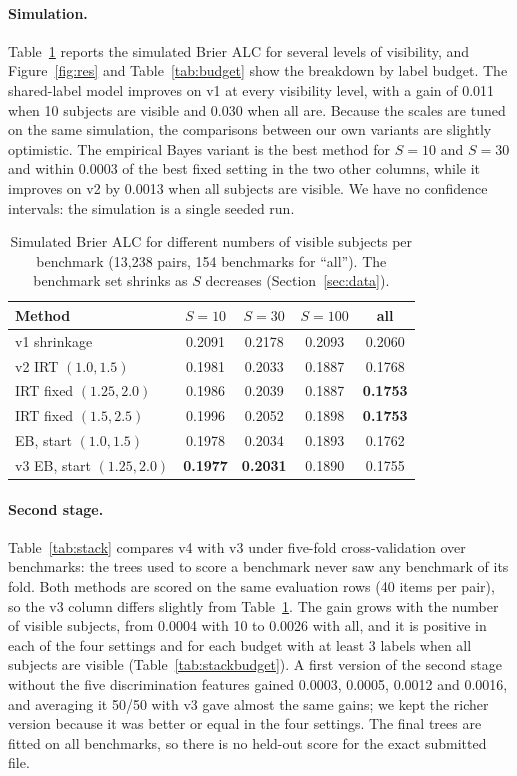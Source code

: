 \documentclass{article}
\begin{document}
\paragraph{Simulation.} Table~\ref{tab:sim} reports the simulated Brier ALC for several levels of visibility, and Figure~\ref{fig:res} and Table~\ref{tab:budget} show the breakdown by label budget. The shared-label model improves on v1 at every visibility level, with a gain of 0.011 when 10 subjects are visible and 0.030 when all are. Because the scales are tuned on the same simulation, the comparisons between our own variants are slightly optimistic. The empirical Bayes variant is the best method for $S{=}10$ and $S{=}30$ and within 0.0003 of the best fixed setting in the two other columns, while it improves on v2 by 0.0013 when all subjects are visible. We have no confidence intervals: the simulation is a single seeded run.

\begin{table}[h]
\centering
\caption{Simulated Brier ALC for different numbers of visible subjects per benchmark (13{,}238 pairs, 154 benchmarks for ``all''). The benchmark set shrinks as $S$ decreases (Section~\ref{sec:data}).}
\label{tab:sim}
\begin{tabular}{lcccc}
\toprule
Method & $S{=}10$ & $S{=}30$ & $S{=}100$ & all \\
\midrule
v1 shrinkage & 0.2091 & 0.2178 & 0.2093 & 0.2060 \\
v2 IRT $(1.0,1.5)$ & 0.1981 & 0.2033 & 0.1887 & 0.1768 \\
IRT fixed $(1.25,2.0)$ & 0.1986 & 0.2039 & 0.1887 & \textbf{0.1753} \\
IRT fixed $(1.5,2.5)$ & 0.1996 & 0.2052 & 0.1898 & \textbf{0.1753} \\
EB, start $(1.0,1.5)$ & 0.1978 & 0.2034 & 0.1893 & 0.1762 \\
v3 EB, start $(1.25,2.0)$ & \textbf{0.1977} & \textbf{0.2031} & 0.1890 & 0.1755 \\
\bottomrule
\end{tabular}
\end{table}

\paragraph{Second stage.} Table~\ref{tab:stack} compares v4 with v3 under five-fold cross-validation over benchmarks: the trees used to score a benchmark never saw any benchmark of its fold. Both methods are scored on the same evaluation rows (40 items per pair), so the v3 column differs slightly from Table~\ref{tab:sim}. The gain grows with the number of visible subjects, from 0.0004 with 10 to 0.0026 with all, and it is positive in each of the four settings and for each budget with at least 3 labels when all subjects are visible (Table~\ref{tab:stackbudget}). A first version of the second stage without the five discrimination features gained 0.0003, 0.0005, 0.0012 and 0.0016, and averaging it 50/50 with v3 gave almost the same gains; we kept the richer version because it was better or equal in the four settings. The final trees are fitted on all benchmarks, so there is no held-out score for the exact submitted file.
\end{document}
